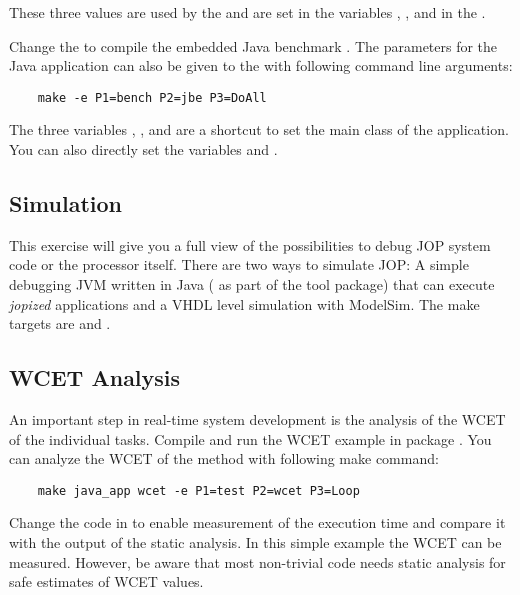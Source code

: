 These three values are used by the  and are set in the
variables , , and  in the
.

Change the  to compile the embedded Java benchmark
. The parameters for the Java application can also
be given to the  with following command line arguments:
\begin{lstlisting}
    make -e P1=bench P2=jbe P3=DoAll
\end{lstlisting}

The three variables , , and  are a
shortcut to set the main class of the application. You can also
directly set the variables  and
.


\subsection{Simulation}

This  exercise will give you a full view of the possibilities to
debug JOP system code or the processor itself. There are two ways to
simulate JOP: A simple debugging JVM written in Java (
as part of the tool package) that can execute \emph{jopized}
applications and a VHDL level simulation with ModelSim. The make
targets are  and .

\subsection{WCET Analysis}

An important step in real-time system development is the analysis of
the WCET of the individual tasks. Compile and run the WCET example
 in package . You can analyze the WCET of
the method  with following make command:
\begin{lstlisting}
    make java_app wcet -e P1=test P2=wcet P3=Loop
\end{lstlisting}
Change the code in  to enable measurement of the
execution time and compare it with the output of the static analysis.
In this simple example the WCET can be measured. However, be aware
that most non-trivial code needs static analysis for safe estimates
of WCET values.
